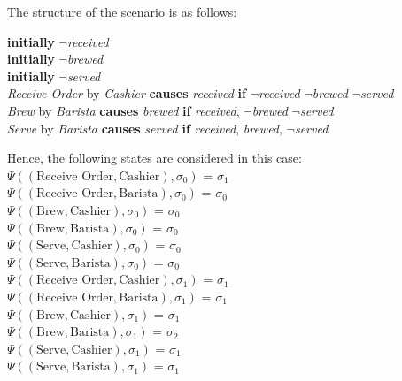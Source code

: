 \documentclass[a4paper]{article}
\begin{document}
The structure of the scenario is as follows:
\begin{center}
\textbf{initially} $\neg$\textit{received} \\[0.1\baselineskip]
\textbf{initially} $\neg$\textit{brewed} \\[0.1\baselineskip]
\textbf{initially} $\neg$\textit{served} \\[0.1\baselineskip]
\textit{Receive Order} by \textit{Cashier} \textbf{causes} \textit{received} \textbf{if} $\neg$\textit{received} $\neg$\textit{brewed} $\neg$\textit{served}\\[0.1\baselineskip]
\textit{Brew} by \textit{Barista} \textbf{causes} \textit{brewed} \textbf{if} \textit{received}, $\neg$\textit{brewed} $\neg$\textit{served}\\[0.1\baselineskip]
\textit{Serve} by \textit{Barista} \textbf{causes} \textit{served} \textbf{if} \textit{received}, \textit{brewed}, $\neg$\textit{served} \\[0.5\baselineskip]
\end{center}
Hence, the following states are considered in this case: \\[0.5\baselineskip] 
$\Psi((\text{Receive Order},\text{Cashier}),\sigma_0)$ = $\sigma_1$ \\[0.1\baselineskip] 
$\Psi((\text{Receive Order},\text{Barista}),\sigma_0)$ = $\sigma_0$ \\[0.1\baselineskip] 
$\Psi((\text{Brew},\text{Cashier}),\sigma_0)$ = $\sigma_0$ \\[0.1\baselineskip] 
$\Psi((\text{Brew},\text{Barista}),\sigma_0)$ = $\sigma_0$ \\[0.1\baselineskip] 
$\Psi((\text{Serve}, \text{Cashier}),\sigma_0)$ = $\sigma_0$ \\[0.1\baselineskip]
$\Psi((\text{Serve}, \text{Barista}),\sigma_0)$ = $\sigma_0$ \\[0.7\baselineskip]
$\Psi((\text{Receive Order},\text{Cashier}),\sigma_1)$ = $\sigma_1$ \\[0.1\baselineskip] 
$\Psi((\text{Receive Order},\text{Barista}),\sigma_1)$ = $\sigma_1$ \\[0.1\baselineskip] 
$\Psi((\text{Brew},\text{Cashier}),\sigma_1)$ = $\sigma_1$ \\[0.1\baselineskip] 
$\Psi((\text{Brew},\text{Barista}),\sigma_1)$ = $\sigma_2$ \\[0.1\baselineskip] 
$\Psi((\text{Serve},\text{Cashier}),\sigma_1)$ = $\sigma_1$ \\[0.1\baselineskip] 
$\Psi((\text{Serve},\text{Barista}),\sigma_1)$ = $\sigma_1$ \\[0.7\baselineskip] 
\end{document}
